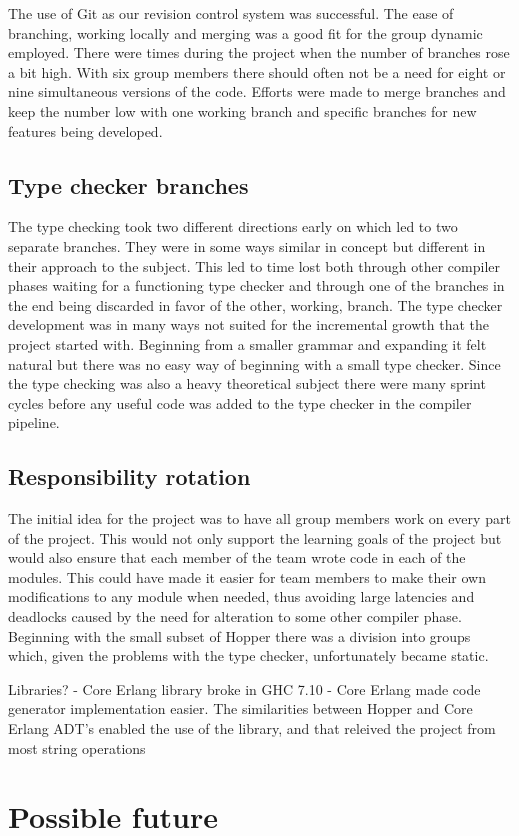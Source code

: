 The use of Git as our revision control system was successful. The ease of branching, working locally and merging was a good fit for the group dynamic employed. 
There were times during the project when the number of branches rose a bit high. With six group members there should often not be a need for eight or nine simultaneous versions of the code. Efforts were made to merge branches and keep the number low with one working branch and specific branches for new features being developed.

\subsection{Type checker branches}


The type checking took two different directions early on which led to two separate branches. They were in some ways similar in concept but different in their approach to the subject. This led to time lost both through other compiler phases waiting for a functioning type checker and through one of the branches in the end being discarded in favor of the other, working, branch. The type checker development was in many ways not suited for the incremental growth that the project started with. Beginning from a smaller grammar and expanding it felt natural but there was no easy way of beginning with a small type checker. Since the type checking was also a heavy theoretical subject there were many sprint cycles before any useful code was added to the type checker in the compiler pipeline. 

\subsection{Responsibility rotation}

The initial idea for the project was to have all group members work on every part of the project. This would not only support the learning goals of the project but would also ensure that each member of the team wrote code in each of the modules. This could have made it easier for team members to make their own modifications to any module when needed, thus avoiding large latencies and deadlocks caused by the need for alteration to some other compiler phase. 
Beginning with the small subset of Hopper there was a division into groups which, given the problems with the type checker, unfortunately became static.




Libraries?
- Core Erlang library broke in GHC 7.10
- Core Erlang made code generator implementation easier. The similarities between Hopper and Core Erlang ADT's enabled the use of the library, and that releived the project from most string operations


\section{Possible future}

